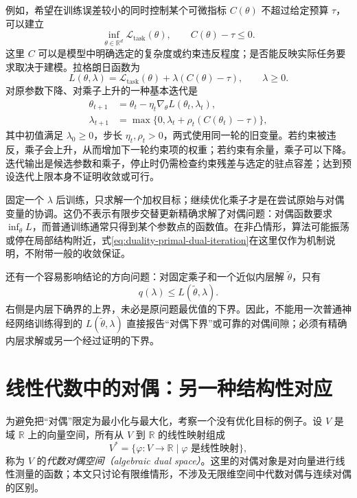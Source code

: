 \documentclass[UTF8,12pt,a4paper,fontset=fandol]{ctexart}
\begin{document}
例如，希望在训练误差较小的同时控制某个可微指标 $C(\theta)$ 不超过给定预算 $\tau$，可以建立
\[
 \inf_{\theta\in\mathbb R^d}\mathcal L_{\mathrm{task}}(\theta),
 \qquad C(\theta)-\tau\leq0.
\]
这里 $C$ 可以是模型中明确选定的复杂度或约束违反程度；是否能反映实际任务要求取决于建模。拉格朗日函数为
\[
 L(\theta,\lambda)
 =\mathcal L_{\mathrm{task}}(\theta)+\lambda(C(\theta)-\tau),
 \qquad\lambda\geq0.
\]
对原参数下降、对乘子上升的一种基本迭代是
\begin{equation}
 \begin{aligned}
 \theta_{t+1}
 &=\theta_t-\eta_t\nabla_\theta L(\theta_t,\lambda_t),\\
 \lambda_{t+1}
 &=\max\{0,\lambda_t+\rho_t(C(\theta_t)-\tau)\},
 \end{aligned}
 \label{eq:duality-primal-dual-iteration}
\end{equation}
其中初值满足 $\lambda_0\geq0$，步长 $\eta_t,\rho_t>0$，两式使用同一轮的旧变量。若约束被违反，乘子会上升，从而增加下一轮约束项的权重；若约束有余量，乘子可以下降。迭代输出是候选参数和乘子，停止时仍需检查约束残差与选定的驻点容差；达到预设迭代上限本身不证明收敛或可行。

固定一个 $\lambda$ 后训练，只求解一个加权目标；继续优化乘子才是在尝试原始与对偶变量的协调。这仍不表示有限步交替更新精确求解了对偶问题：对偶函数要求 $\inf_\theta L$，而普通训练通常只得到某个参数点的函数值。在非凸情形，算法可能振荡或停在局部结构附近，式\eqref{eq:duality-primal-dual-iteration}在这里仅作为机制说明，不附带一般的收敛保证。

还有一个容易影响结论的方向问题：对固定乘子和一个近似内层解 $\widetilde\theta$，只有
\[
 q(\lambda)\leq L(\widetilde\theta,\lambda).
\]
右侧是内层下确界的上界，未必是原问题最优值的下界。因此，不能用一次普通神经网络训练得到的 $L(\widetilde\theta,\lambda)$ 直接报告“对偶下界”或可靠的对偶间隙；必须有精确内层求解或另一个经过证明的下界。

\section{线性代数中的对偶：另一种结构性对应}
\label{sec:duality-linear}

为避免把“对偶”限定为最小化与最大化，考察一个没有优化目标的例子。设 $V$ 是域 $\mathbb R$ 上的向量空间，所有从 $V$ 到 $\mathbb R$ 的线性映射组成
\[
 V^*=\{\varphi:V\to\mathbb R\mid\varphi\text{ 是线性映射}\},
\]
称为 $V$ 的\emph{代数对偶空间（algebraic dual space）}。这里的对偶对象是对向量进行线性测量的函数；本文只讨论有限维情形，不涉及无限维空间中代数对偶与连续对偶的区别。
\end{document}
